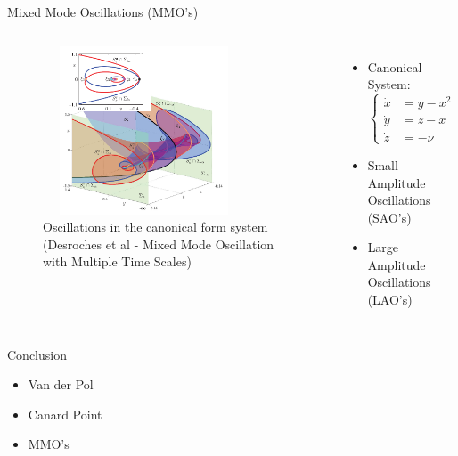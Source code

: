 \documentclass[11pt]{beamer}
\begin{document}
\begin{frame}{Mixed Mode Oscillations (MMO's)}
\begin{columns}
	\begin{figure}
		
		\includegraphics[height=5cm,width=6cm]{Images/MMO-spirals}
		\caption{Oscillations in the canonical form system (Desroches et al - Mixed Mode Oscillation with Multiple Time Scales)}
		
	\end{figure}
	\begin{itemize}
		\item Canonical System:
		\begin{equation*}
			 \begin{cases}
			\dot{x}&=y-x^2\\
			\dot{y}&=z-x\\
			\dot{z}&=-\nu
			\end{cases} 
		\end{equation*}
		\item Small Amplitude Oscillations (SAO's)
		\item Large Amplitude Oscillations (LAO's)
		
	\end{itemize}
\end{columns}
\end{frame}

\begin{frame}{Conclusion}
\begin{itemize}
    \item Van der Pol 
    \item Canard Point
    \item MMO's
\end{itemize}
\end{frame}
\end{document}
